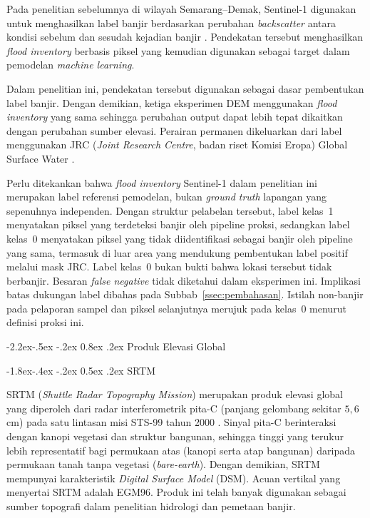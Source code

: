 \documentclass[12pt,a4paper]{article}
\makeatletter
\renewcommand\subsection{\@startsection{subsection}{2}{\z@}%
  {-2.2ex\@plus -.5ex \@minus -.2ex}%
  {0.8ex \@plus .2ex}%
  {\normalfont\normalsize\bfseries}}
\renewcommand\subsubsection{\@startsection{subsubsection}{3}{\z@}%
  {-1.8ex\@plus -.4ex \@minus -.2ex}%
  {0.5ex \@plus .2ex}%
  {\normalfont\normalsize\bfseries}}
\makeatother
\begin{document}
Pada penelitian sebelumnya di wilayah Semarang--Demak, Sentinel-1 digunakan
untuk menghasilkan label banjir berdasarkan perubahan \textit{backscatter}
antara kondisi sebelum dan sesudah kejadian banjir \citep{hakim2026}.
Pendekatan tersebut menghasilkan \textit{flood inventory} berbasis piksel
yang kemudian digunakan sebagai target dalam pemodelan \textit{machine
learning}.

Dalam penelitian ini, pendekatan tersebut digunakan sebagai dasar pembentukan
label banjir. Dengan demikian, ketiga eksperimen DEM menggunakan
\textit{flood inventory} yang sama sehingga perubahan output dapat lebih
tepat dikaitkan dengan perubahan sumber elevasi. Perairan permanen
dikeluarkan dari label menggunakan JRC (\textit{Joint Research Centre},
badan riset Komisi Eropa) Global Surface Water \citep{pekel2016}.

Perlu ditekankan bahwa \textit{flood inventory} Sentinel-1 dalam penelitian
ini merupakan label referensi pemodelan, bukan \textit{ground truth}
lapangan yang sepenuhnya independen. Dengan struktur pelabelan tersebut,
label kelas~1 menyatakan piksel yang terdeteksi banjir oleh pipeline
proksi, sedangkan label kelas~0 menyatakan piksel yang tidak diidentifikasi
sebagai banjir oleh pipeline yang sama, termasuk di luar area yang
mendukung pembentukan label positif melalui mask JRC. Label kelas~0 bukan
bukti bahwa lokasi tersebut tidak berbanjir. Besaran \textit{false negative}
tidak diketahui dalam eksperimen ini. Implikasi batas dukungan label
dibahas pada Subbab~\ref{ssec:pembahasan}. Istilah non-banjir pada
pelaporan sampel dan piksel selanjutnya merujuk pada kelas~0 menurut
definisi proksi ini.

\subsection{Produk Elevasi Global}

\subsubsection{SRTM}

SRTM (\textit{Shuttle Radar Topography Mission}) merupakan produk elevasi
global yang diperoleh dari radar interferometrik pita-C (panjang gelombang
sekitar $5{,}6$ cm) pada satu lintasan misi STS-99 tahun 2000
\citep{farr2007}. Sinyal pita-C berinteraksi dengan kanopi vegetasi dan
struktur bangunan, sehingga tinggi yang terukur lebih representatif bagi
permukaan atas (kanopi serta atap bangunan) daripada permukaan tanah tanpa
vegetasi (\textit{bare-earth}). Dengan demikian, SRTM mempunyai
karakteristik \textit{Digital Surface Model} (DSM).
Acuan vertikal yang menyertai SRTM adalah EGM96. Produk ini telah banyak
digunakan sebagai sumber topografi dalam penelitian
hidrologi dan pemetaan banjir.
\end{document}
